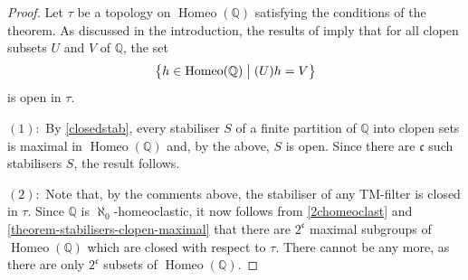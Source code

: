 \documentclass[11pt]{amsart}
\makeatletter
\newtheorem{lemma}[theorem]{Lemma}
\theoremstyle{definition}
\newcommand{\Homeo}{\operatorname{Homeo}}
\newcommand{\Q}{\mathbb Q}
\newcommand{\makeset}[2]{\left\lbrace #1 \;\middle|\;
 \begin{tabular}{@{}l@{}}
   #2
  \end{tabular}
  \right\rbrace}
\makeatother
\begin{document}
\BBB*

\begin{proof}
    Let $\tau$ be a topology on $\Homeo(\Q)$ satisfying the conditions of the theorem. As discussed in the introduction, the results of \cite{Concilio} imply that for all clopen subsets $U$ and $V$ of $\Q$, the set 
    \[\makeset{h\in \operatorname{Homeo}(\Q)}{\((U)h=V\)}\]
    is  open in $\tau$.

    $(1) :$ By \cref{closedstab}, every stabiliser $S$ of a finite partition of $\Q$ into clopen sets is maximal in $\Homeo(\Q)$ and, by the above, $S$ is open. Since there are \(\mathfrak{c}\) such stabilisers $S$, the result follows.
    
     $(2):$ 
     Note that, by the comments above, the stabiliser of any TM-filter is closed in $\tau$. Since $\Q$ is $\aleph_0$-homeoclastic, it now follows from \cref{2chomeoclast} and \cref{theorem-stabilisers-clopen-maximal} that there are  \(2^{\mathfrak{c}}\) maximal subgroups of \(\operatorname{Homeo}(\Q)\) which are closed with respect to $\tau$. There cannot be any more, as there are only \(2^{\mathfrak{c}}\) subsets of \(\operatorname{Homeo}(\Q)\).  
\end{proof}







\end{document}
